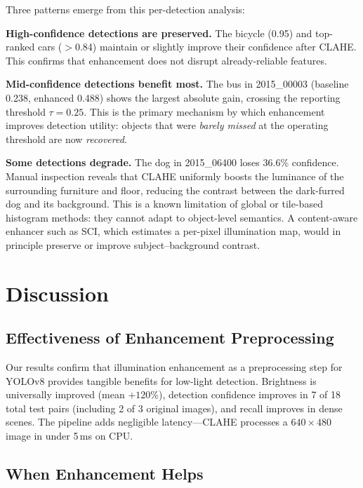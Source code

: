 \documentclass[conference]{IEEEtran}
\begin{document}
Three patterns emerge from this per-detection analysis:

\textbf{High-confidence detections are preserved.}
The bicycle (0.95) and top-ranked cars ($>$0.84) maintain or slightly
improve their confidence after CLAHE.  This confirms that enhancement
does not disrupt already-reliable features.

\textbf{Mid-confidence detections benefit most.}
The bus in 2015\_00003 (baseline 0.238, enhanced 0.488) shows the
largest absolute gain, crossing the reporting threshold $\tau=0.25$.
This is the primary mechanism by which enhancement improves
detection utility: objects that were \emph{barely missed} at the
operating threshold are now \emph{recovered}.

\textbf{Some detections degrade.}
The dog in 2015\_06400 loses 36.6\% confidence.  Manual inspection
reveals that CLAHE uniformly boosts the luminance of the surrounding
furniture and floor, reducing the contrast between the dark-furred
dog and its background.  This is a known limitation of global or
tile-based histogram methods: they cannot adapt to object-level
semantics.  A content-aware enhancer such as SCI, which estimates a
per-pixel illumination map, would in principle preserve or improve
subject--background contrast.

\section{Discussion}
\label{sec:discussion}

\subsection{Effectiveness of Enhancement Preprocessing}

Our results confirm that illumination enhancement as a preprocessing step
for YOLOv8 provides tangible benefits for low-light detection. Brightness
is universally improved (mean $+120\%$), detection confidence improves in
7 of 18 total test pairs (including 2 of 3 original images), and recall improves
in dense scenes. The pipeline adds negligible latency---CLAHE processes a
$640{\times}480$ image in under 5\,ms on CPU.

\subsection{When Enhancement Helps}
\end{document}
